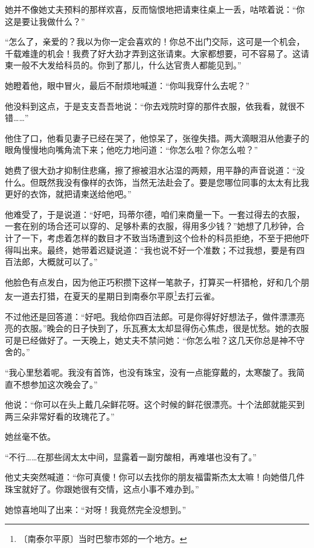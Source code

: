 \documentclass[12pt,UTF-8,openany]{ctexbook}
\begin{document}
\begin{normalsize}
    她并不像她丈夫预料的那样欢喜，反而恼恨地把请柬往桌上一丢，咕哝着说：“你这是要让我做什么？”
    
    “怎么了，亲爱的？我以为你一定会喜欢的！你总不出门交际，这可是一个机会，千载难逢的机会！我费了好大劲才弄到这张请柬。大家都想要，可不容易了。这请柬一般不大发给科员的。你到了那儿，什么达官贵人都能见到。”
    
    她瞪着他，眼中冒火，最后不耐烦地喊道：“你叫我穿什么去呢？”
    
    他没料到这点，于是支支吾吾地说：“你去戏院时穿的那件衣服，依我看，就很不错……”
    
    他住了口，他看见妻子已经在哭了，他惊呆了，张徨失措。两大滴眼泪从他妻子的眼角慢慢地向嘴角流下来；他吃力地问道：“你怎么啦？你怎么啦？”
    
    她费了很大劲才抑制住悲痛，擦了擦被泪水沾湿的两颊，用平静的声音说道：“没什么。但既然我没有像样的衣饰，当然无法赴会了。要是您哪位同事的太太有比我更好的衣饰，就把请柬送给他吧。”
    
    他难受了，于是说道：“好吧，玛蒂尔德，咱们来商量一下。一套过得去的衣服，一套在别的场合还可以穿的、足够朴素的衣服，得用多少钱？”她想了几秒钟，合计了一下，考虑着怎样的数目才不致当场遭到这个俭朴的科员拒绝，不至于把他吓得叫出来。最终，她带着迟疑说道：“我也说不好一个准数；不过我想，要是有四百法郎，大概就可以了。”
    
    他脸色有点发白，因为他正巧积攒下这样一笔款子，打算买一杆猎枪，好和几个朋友一道去打猎，在夏天的星期日到南泰尔平原\footnote{〔南泰尔平原〕当时巴黎市郊的一个地方。}去打云雀。
    
    不过他还是回答道：“好吧。我给你四百法郎。可是你得好好想法子，做件漂漂亮亮的衣服。”晚会的日子快到了，乐瓦赛太太却显得伤心焦虑，很是忧愁。她的衣服可是已经做好了。一天晚上，她丈夫不禁问她：“你怎么啦？这几天你总是神不守舍的。”
    
    “我心里愁着呢。我没有首饰，也没有珠宝，没有一点能穿戴的，太寒酸了。我简直不想参加这次晚会了。”
    
    他说：“你可以在头上戴几朵鲜花呀。这个时候的鲜花很漂亮。十个法郎就能买到两三朵非常好看的玫瑰花了。”
    
    她丝毫不依。
    
    “不行……在那些阔太太中间，显露着一副穷酸相，再难堪也没有了。”
    
    他丈夫突然喊道：“你可真傻！你可以去找你的朋友福雷斯杰太太嘛！向她借几件珠宝就好了。你跟她很有交情，这点小事不难办到。”
    
    她惊喜地叫了出来：“对呀！我竟然完全没想到。”
    

\end{normalsize}
\end{document}
